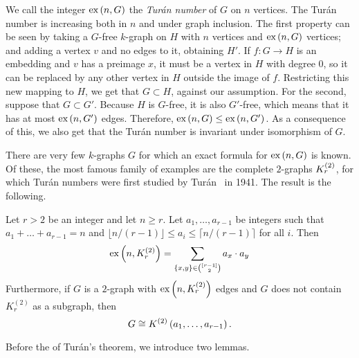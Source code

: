 We call the integer $\text{ex} \left( n, G \right)$ the \emph{Turán number} of $G$ on $n$ vertices.
The Turán number is increasing both in $n$ and under graph inclusion.
The first property can be seen by taking a $G$-free $k$-graph on $H$ with $n$ vertices
and $\text{ex} \left( n, G \right)$ vertices; and adding a vertex $v$ and no edges to it, obtaining $H'$.
If $f: G \to H$ is an embedding and $v$ has a preimage $x$, it must be a vertex in $H$ with degree $0$,
so it can be replaced by any other vertex in $H$ outside the image of $f$.
Restricting this new mapping to $H$, we get that $G \subset H$, against our assumption.
For the second, suppose that $G \subset G'$.
Because $H$ is $G$-free, it is also $G'$-free, which means that it has at most $\text{ex} \left( n, G' \right)$ edges.
Therefore, $\text{ex} \left( n, G \right) \leq \text{ex} \left( n, G' \right)$.
As a consequence of this, we also get that the Turán number is invariant under isomorphism of $G$.

There are very few $k$-graphs $G$ for which an exact formula for $\text{ex} \left( n, G \right)$ is known.
Of these, the most famous family of examples are the complete $2$-graphs $K^{(2)}_{r}$,
for which Turán numbers were first studied by Turán~\cite{Turan1941} in 1941.
The result is the following.

\begin{theorem}
    \label{thm:turan}
    Let $r > 2$ be an integer and let $n \geq r$.
    Let $a_1, \dots, a_{r-1}$ be integers such that $a_1 + \dots + a_{r-1} = n$
    and $\lfloor n / (r-1) \rfloor \leq a_i \leq \lceil n / (r-1) \rceil$ for all $i$.
    Then
    \begin{equation} \label{eq:turan}
        \text{ex} \left( n, K^{(2)}_{r} \right) = \sum_{\{x, y\} \in \binom{[r-1]}{2}} a_x \cdot a_y
    \end{equation}
    Furthermore, if $G$ is a $2$-graph with $\text{ex} \left( n, K^{(2)}_{r} \right)$ edges
    and $G$ does not contain $K_r^{(2)}$ as a subgraph, then
    \[
        G\cong K^{(2)}\left(a_1, \dots, a_{r-1}\right).
    \]

\end{theorem}

Before the  of Turán's theorem, we introduce two lemmas.

